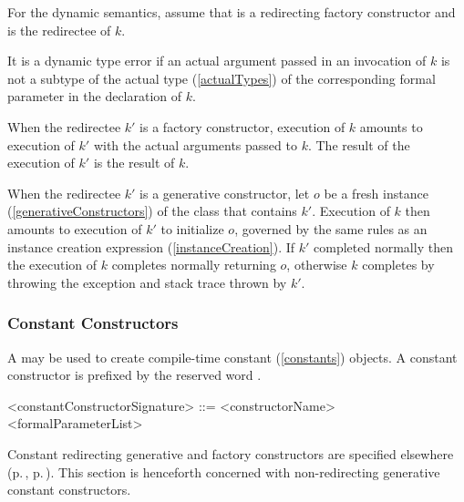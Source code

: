 \documentclass[makeidx]{article}
\begin{document}
\LMHash{}%
For the dynamic semantics,
assume that  is a redirecting factory constructor
and  is the redirectee of $k$.

\LMHash{}%
It is a dynamic type error if an actual argument passed in an invocation of $k$
is not a subtype of the actual type (\ref{actualTypes})
of the corresponding formal parameter in the declaration of $k$.

\LMHash{}%
When the redirectee $k'$ is a factory constructor,
execution of $k$ amounts to execution of $k'$
with the actual arguments passed to $k$.
The result of the execution of $k'$ is the result of $k$.

\LMHash{}%
When the redirectee $k'$ is a generative constructor,
let $o$ be a fresh instance (\ref{generativeConstructors})
of the class that contains $k'$.
Execution of $k$ then amounts to execution of $k'$ to initialize $o$,
governed by the same rules as an instance creation expression
(\ref{instanceCreation}).
If $k'$ completed normally then the execution of $k$
completes normally returning $o$,
otherwise $k$ completes by throwing the exception and stack trace
thrown by $k'$.


\subsubsection{Constant Constructors}

\LMHash{}%
A 
may be used to create compile-time constant (\ref{constants}) objects.
A constant constructor is prefixed by the reserved word \CONST.

\begin{grammar}
<constantConstructorSignature> ::= \gnewline{}
  \CONST{} <constructorName> <formalParameterList>
\end{grammar}


\LMHash{}%
Constant redirecting generative and factory constructors are specified elsewhere
(p.\,\pageref{redirectingGenerativeConstructors},
p.\,\pageref{redirectingFactoryConstructors}).
This section is henceforth concerned with
non-redirecting generative constant constructors.
\end{document}

